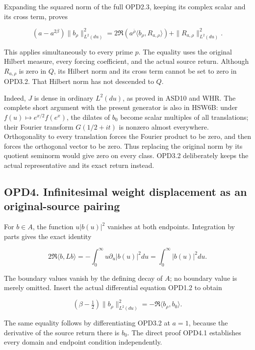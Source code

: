 Expanding the squared norm of the full OPD2.3, keeping its complex
scalar and its cross term, proves

\[
\boxed{
(a-a^{2\beta})\|b_\rho\|_{L^2(du)}^2
=2\Re\!\left(a^{\bar\rho}\langle b_\rho,R_{a,\rho}\rangle\right)
 +\|R_{a,\rho}\|_{L^2(du)}^2.}
\tag{OPD3.2}
\]

This applies simultaneously to every prime \(p\). The equality uses the
original Hilbert measure, every forcing coefficient, and the actual
source return. Although \(R_{a,\rho}\) is zero in \(Q\), its Hilbert
norm and its cross term cannot be set to zero in OPD3.2. That Hilbert
norm has not descended to \(Q\).

Indeed, \(J\) is dense in ordinary \(L^2(du)\), as proved in ASD10 and
WHR. The complete short argument with the present generator is also in
HSW6B: under \(f(u)\mapsto e^{x/2}f(e^x)\), the dilates of \(b_0\)
become scalar multiples of all translations; their Fourier transform
\(G(1/2+it)\) is nonzero almost everywhere. Orthogonality to every
translation forces the Fourier product to be zero, and then forces the
orthogonal vector to be zero. Thus replacing the original norm by its
quotient seminorm would give zero on every class. OPD3.2 deliberately
keeps the actual representative and its exact return instead.

\subsection{OPD4. Infinitesimal weight displacement as an
original-source
pairing}\label{opd4.-infinitesimal-weight-displacement-as-an-original-source-pairing}

For \(b\in A\), the function \(u|b(u)|^2\) vanishes at both endpoints.
Integration by parts gives the exact identity

\[
2\Re\langle b,Lb\rangle
=-\int_0^\infty u\partial_u|b(u)|^2du
=\int_0^\infty|b(u)|^2du.
\tag{OPD4.1}
\]

The boundary values vanish by the defining decay of \(A\); no boundary
value is merely omitted. Insert the actual differential equation OPD1.2
to obtain

\[
\boxed{(\beta-\tfrac12)\|b_\rho\|_{L^2(du)}^2
=-\Re\langle b_\rho,b_0\rangle.}
\tag{OPD4.2}
\]

The same equality follows by differentiating OPD3.2 at \(a=1\), because
the derivative of the source return there is \(b_0\). The direct proof
OPD4.1 establishes every domain and endpoint condition independently.

